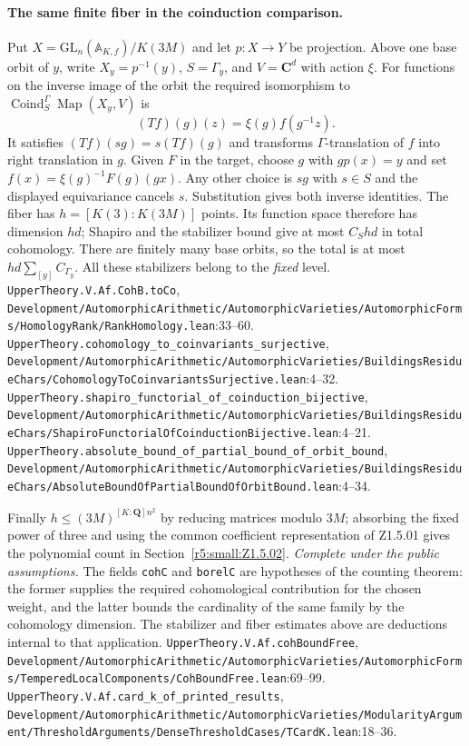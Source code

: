\paragraph{The same finite fiber in the coinduction comparison.}
Put $X=\mathrm{GL}_n(\mathbb A_{K,f})/K(3M)$ and let $p:X\to Y$ be projection. Above one base orbit of $y$, write $X_y=p^{-1}(y)$, $S=\Gamma_y$, and $V=\mathbf C^d$ with action $\xi$. For functions on the inverse image of the orbit the required isomorphism to $\operatorname{Coind}_S^\Gamma\operatorname{Map}(X_y,V)$ is
\[
 (Tf)(g)(z)=\xi(g) f(g^{-1}z).
\]
It satisfies $(Tf)(sg)=s(Tf)(g)$ and transforms $\Gamma$-translation of $f$ into right translation in $g$. Given $F$ in the target, choose $g$ with $gp(x)=y$ and set $f(x)=\xi(g)^{-1}F(g)(gx)$. Any other choice is $sg$ with $s\in S$ and the displayed equivariance cancels $s$. Substitution gives both inverse identities. The fiber has $h=[K(3):K(3M)]$ points. Its function space therefore has dimension $hd$; Shapiro and the stabilizer bound give at most $C_Shd$ in total cohomology. There are finitely many base orbits, so the total is at most $hd\sum_{[y]} C_{\Gamma_y}$. All these stabilizers belong to the \emph{fixed} level.
{\footnotesize\nolinkurl{UpperTheory.V.Af.CohB.toCo}, \nolinkurl{Development/AutomorphicArithmetic/AutomorphicVarieties/AutomorphicForms/HomologyRank/RankHomology.lean}\allowbreak:33--60.} {\footnotesize\nolinkurl{UpperTheory.cohomology_to_coinvariants_surjective}, \nolinkurl{Development/AutomorphicArithmetic/AutomorphicVarieties/BuildingsResidueChars/CohomologyToCoinvariantsSurjective.lean}\allowbreak:4--32.} {\footnotesize\nolinkurl{UpperTheory.shapiro_functorial_of_coinduction_bijective}, \nolinkurl{Development/AutomorphicArithmetic/AutomorphicVarieties/BuildingsResidueChars/ShapiroFunctorialOfCoinductionBijective.lean}\allowbreak:4--21.} {\footnotesize\nolinkurl{UpperTheory.absolute_bound_of_partial_bound_of_orbit_bound}, \nolinkurl{Development/AutomorphicArithmetic/AutomorphicVarieties/BuildingsResidueChars/AbsoluteBoundOfPartialBoundOfOrbitBound.lean}\allowbreak:4--34.}

Finally $h\le(3M)^{[K:\mathbf Q]n^2}$ by reducing matrices modulo $3M$; absorbing the fixed power of three and using the common coefficient representation of Z1.5.01 gives the polynomial count in Section~\ref{r5:small:Z1.5.02}. \textit{Complete under the public assumptions.} The fields \nolinkurl{cohC} and \nolinkurl{borelC} are hypotheses of the counting theorem: the former supplies the required cohomological contribution for the chosen weight, and the latter bounds the cardinality of the same family by the cohomology dimension. The stabilizer and fiber estimates above are deductions internal to that application.
{\footnotesize\nolinkurl{UpperTheory.V.Af.cohBoundFree}, \nolinkurl{Development/AutomorphicArithmetic/AutomorphicVarieties/AutomorphicForms/TemperedLocalComponents/CohBoundFree.lean}\allowbreak:69--99.} {\footnotesize\nolinkurl{UpperTheory.V.Af.card_k_of_printed_results}, \nolinkurl{Development/AutomorphicArithmetic/AutomorphicVarieties/ModularityArgument/ThresholdArguments/DenseThresholdCases/TCardK.lean}\allowbreak:18--36.}

